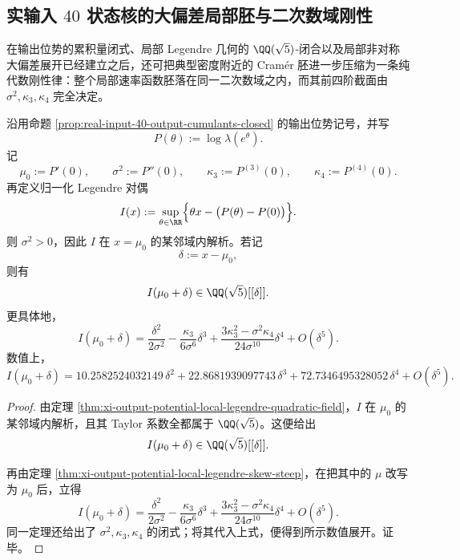 \subsection{实输入 \texorpdfstring{$40$}{40} 状态核的大偏差局部胚与二次数域刚性}\label{subsec:conclusion-realinput40-local-legendre-quadratic-field-rigidity}
在输出位势的累积量闭式、局部 Legendre 几何的 \(\QQ(\sqrt5)\)-闭合以及局部非对称大偏差展开已经建立之后，还可把典型密度附近的 Cram\'er 胚进一步压缩为一条纯代数刚性律：整个局部速率函数胚落在同一二次数域之内，而其前四阶截面由 \(\sigma^2,\kappa_3,\kappa_4\) 完全决定。

\begin{theorem}\label{thm:conclusion-realinput40-legendre-quadratic-field-rigidity}
沿用命题 \ref{prop:real-input-40-output-cumulants-closed} 的输出位势记号，并写
\[
P(\theta):=\log \lambda(e^\theta).
\]
记
\[
\mu_0:=P'(0),
\qquad
\sigma^2:=P''(0),
\qquad
\kappa_3:=P^{(3)}(0),
\qquad
\kappa_4:=P^{(4)}(0).
\]
再定义归一化 Legendre 对偶
\[
I(x):=\sup_{\theta\in\RR}\Bigl\{\theta x-\bigl(P(\theta)-P(0)\bigr)\Bigr\}.
\]
则 \(\sigma^2>0\)，因此 \(I\) 在 \(x=\mu_0\) 的某邻域内解析。若记
\[
\delta:=x-\mu_0,
\]
则有
\[
I(\mu_0+\delta)\in \QQ(\sqrt5)[[\delta]].
\]
更具体地，
\[
I(\mu_0+\delta)
=
\frac{\delta^2}{2\sigma^2}
-\frac{\kappa_3}{6\sigma^6}\delta^3
+\frac{3\kappa_3^2-\sigma^2\kappa_4}{24\sigma^{10}}\delta^4
+O(\delta^5).
\]
数值上，
\[
I(\mu_0+\delta)
=
10.2582524032149\,\delta^2
+
22.8681939097743\,\delta^3
+
72.7346495328052\,\delta^4
+
O(\delta^5).
\]
\end{theorem}
\begin{proof}
由定理 \ref{thm:xi-output-potential-local-legendre-quadratic-field}，\(I\) 在 \(\mu_0\) 的某邻域内解析，且其 Taylor 系数全都属于 \(\QQ(\sqrt5)\)。这便给出
\[
I(\mu_0+\delta)\in \QQ(\sqrt5)[[\delta]].
\]

再由定理 \ref{thm:xi-output-potential-local-legendre-skew-steep}，在把其中的 \(\mu\) 改写为 \(\mu_0\) 后，立得
\[
I(\mu_0+\delta)
=
\frac{\delta^2}{2\sigma^2}
-\frac{\kappa_3}{6\sigma^6}\delta^3
+\frac{3\kappa_3^2-\sigma^2\kappa_4}{24\sigma^{10}}\delta^4
+O(\delta^5).
\]
同一定理还给出了 \(\sigma^2,\kappa_3,\kappa_4\) 的闭式；将其代入上式，便得到所示数值展开。证毕。
\end{proof}

